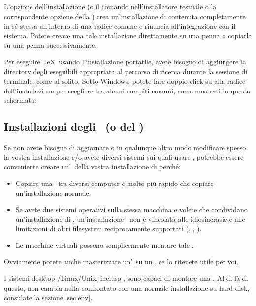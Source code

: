 \documentclass{article}
\begin{document}
L'opzione  dell'installazione (o il comando 
nell'installatore testuale o la corrispondente opzione della \GUI) crea
un'installazione di \TL{} contenuta completamente in sé stessa all'interno
di una radice comune e rinuncia all'integrazione con il sistema. Potete
creare una tale installazione direttamente su una penna \USB{} o copiarla su
una penna \USB{} successivamente.

Per eseguire \TeX\ usando l'installazione portatile, avete bisogno di
aggiungere la directory degli eseguibili appropriata al percorso di ricerca
durante la sessione di terminale, come al solito. Sotto Windows, potete fare
doppio click su  alla radice dell'installazione per
scegliere tra alcuni compiti comuni, come mostrati in questa schermata:

\medskip
{}
\smallskip


\subsection{Installazioni degli \ISO\ (o del \DVD)}
\label{sec:isoinstall}

Se non avete bisogno di aggiornare o in qualunque altro modo modificare
spesso la vostra installazione e\slash o avete diversi sistemi sui quali
usare \TL, potrebbe essere conveniente creare un'\ISO\ della vostra
installazione di \TL{} perché:

\begin{itemize}
\item Copiare una \ISO\ tra diversi computer è molto più rapido che copiare
  un'installazione normale.
\item Se avete due sistemi operativi sulla stessa macchina e volete che
  condividano un'installazione di \TL, un'installazione \ISO\ non è
  vincolata alle idiosincrasie e alle limitazioni di altri filesystem
  reciprocamente supportati (, , ).
\item Le macchine virtuali possono semplicemente montare tale \ISO.
\end{itemize}

Ovviamente potete anche masterizzare un'\ISO\ su un \DVD, se lo ritenete
utile per voi.

I sistemi desktop \GNU/Linux/Unix, incluso \MacOSX, sono capaci di montare
una \ISO. Al di là di questo, non cambia nulla confrontato con una normale
installazione su hard disk, consulate la sezione \ref{sec:env}.
\end{document}
